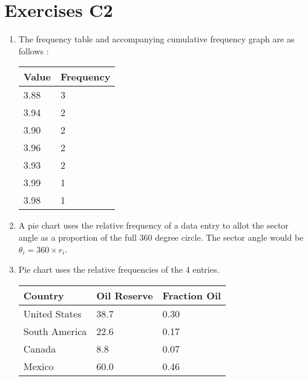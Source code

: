 \chapter*{Exercises C2}

\begin{enumerate}
	\item The frequency table and accompanying cumulative frequency graph are as follows : 
	\begin{table}[h]
		\centering
		\begin{tabular}{@{}ll@{}}
			\toprule
			Value & Frequency \\ \midrule
			3.88  & 3         \\
			3.94  & 2         \\
			3.90  & 2         \\
			3.96  & 2         \\
			3.93  & 2         \\
			3.99  & 1         \\
			3.98  & 1         \\ \bottomrule
		\end{tabular}
	\end{table}
	
	\begin{figure}[!h]
		\centering
	\end{figure}
	
	\item A pie chart uses the relative frequency of a data entry to allot the sector angle as a proportion of the full 360 degree circle. The sector angle would be $ \theta_i = 360 \times r_i $. \\
	
	\item Pie chart uses the relative frequencies of the 4 entries. \\
	\begin{table}[H]
		\centering
		\begin{tabular}{@{}lll@{}}
			\toprule
			Country       & Oil Reserve & Fraction Oil        \\ \midrule
			United States & 38.7        & 0.30  \\
			South America & 22.6        & 0.17 \\
			Canada        & 8.8         & 0.07  \\
			Mexico        & 60.0        & 0.46  \\ \bottomrule
		\end{tabular}
	\end{table}
	

\end{enumerate}
